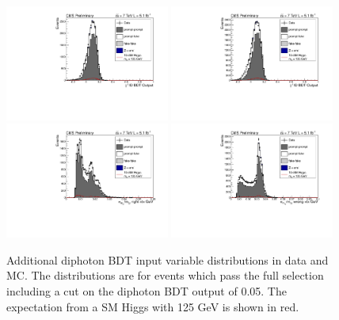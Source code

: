 \begin{figure}[hbt!]
\begin{center}
  \includegraphics[width=0.48\textwidth]{hgg7TeV/variablePlots/phoid_1}
  \includegraphics[width=0.48\textwidth]{hgg7TeV/variablePlots/phoid_2}\\
  \includegraphics[width=0.48\textwidth]{hgg7TeV/variablePlots/sigmrv}
  \includegraphics[width=0.48\textwidth]{hgg7TeV/variablePlots/sigmwv}
 \label{fig:diphotonbdtvars2}
 \caption{Additional diphoton BDT input variable distributions in data and MC. 
	  The distributions are for events which pass the full selection 
	  including a cut on the diphoton BDT output of 0.05.
 	  The expectation from a SM Higgs with 125 GeV is shown in red.}
\end{center}
\end{figure}

